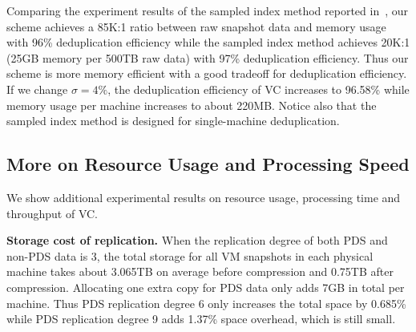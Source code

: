 
Comparing the experiment results of the sampled index method reported in~\cite{Guo2011}, 
our scheme achieves a 85K:1 ratio between raw snapshot data and memory usage 
with 96\% deduplication efficiency
while the sampled index method achieves 20K:1 (25GB memory per 500TB raw data)
with 97\% deduplication efficiency.
Thus our scheme is more memory efficient with a good tradeoff for deduplication efficiency.
If we change $\sigma=4\%$, the deduplication efficiency of VC increases to 96.58\% while
memory usage per machine increases to about 220MB. 
Notice also that the sampled index method is designed for single-machine deduplication.


\subsection{More on Resource Usage and Processing Speed}

We show  additional experimental results on resource usage, processing time and throughput of VC.

{\bf Storage cost of replication.} 
When the replication degree of both PDS and non-PDS data is 3, 
the total storage  for all VM snapshots in each physical machine takes about 3.065TB on average before compression
and 0.75TB after compression.  Allocating  one extra  copy for PDS data only adds  7GB in total per machine.
Thus PDS replication degree 6 only increases the total space by 0.685\% while PDS replication degree 9 adds 1.37\% 
space overhead, which is still small.

